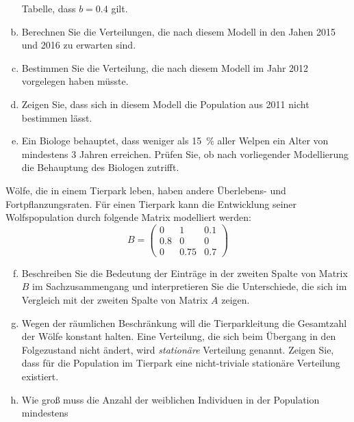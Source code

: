\begin{exercise}
\begin{enumerate}[a)]
            Tabelle, dass $b=\num{0.4}$ gilt.
      \item Berechnen Sie die Verteilungen, die nach
            diesem Modell in den Jahen 2015 und 2016
            zu erwarten sind.
      \item Bestimmen Sie die Verteilung, die nach
            diesem Modell im Jahr 2012 vorgelegen
            haben müsste.
      \item Zeigen Sie, dass sich in diesem Modell
            die Population aus 2011 nicht bestimmen
            lässt.
      \item Ein Biologe behauptet, dass weniger als
            \SI{15}{\percent} aller Welpen ein Alter
            von mindestens 3 Jahren erreichen.
            Prüfen Sie, ob nach vorliegender
            Modellierung die Behauptung des Biologen
            zutrifft.
    \end{enumerate}
    Wölfe, die in einem Tierpark leben, haben andere
    Überlebens- und Fortpflanzungsraten. Für einen
    Tierpark kann die Entwicklung seiner
    Wolfspopulation durch folgende Matrix modelliert
    werden:
    \begin{equation*}
      B=
      \begin{pmatrix}
        \num{0}   & \num{1}    & \num{0.1} \\
        \num{0.8} & \num{0}    & \num{0}   \\
        \num{0}   & \num{0.75} & \num{0.7}
      \end{pmatrix}
    \end{equation*}
    \begin{enumerate}[a)]
      \setcounter{enumi}{5}%
      \item Beschreiben Sie die Bedeutung der
            Einträge in der zweiten Spalte von
            Matrix $B$ im Sachzusammengang und
            interpretieren Sie die Unterschiede,
            die sich im Vergleich mit der zweiten
            Spalte von Matrix $A$ zeigen.
      \item Wegen der räumlichen Beschränkung will
            die Tierparkleitung die Gesamtzahl der
            Wölfe konstant halten.
            Eine Verteilung, die sich beim Übergang
            in den Folgezustand nicht ändert, wird
            \emph{stationäre} Verteilung genannt.
            Zeigen Sie, dass für die Population im
            Tierpark eine nicht-triviale
            stationäre Verteilung existiert.
      \item Wie groß muss die Anzahl der weiblichen
            Individuen in der Population mindestens

\end{enumerate}
\end{exercise}
